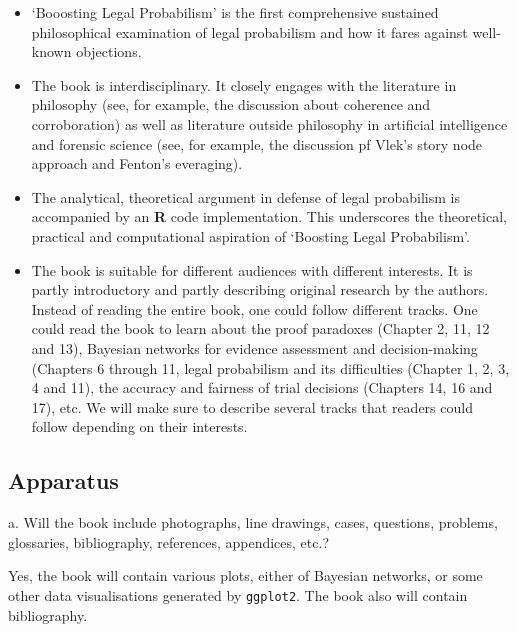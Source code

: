\documentclass[10pt,dvipsnames,enabledeprecatedfontcommands]{scrartcl}
\begin{document}
\begin{itemize}
\item
  `Booosting Legal Probabilism' is the first comprehensive sustained
  philosophical examination of legal probabilism and how it fares
  against well-known objections.
\item
  The book is interdisciplinary. It closely engages with the literature
  in philosophy (see, for example, the discussion about coherence and
  corroboration) as well as literature outside philosophy in artificial
  intelligence and forensic science (see, for example, the discussion pf
  Vlek's story node approach and Fenton's everaging).
\item
  The analytical, theoretical argument in defense of legal probabilism
  is accompanied by an \textbf{\textsf{R}} code implementation. This
  underscores the theoretical, practical and computational aspiration of
  `Boosting Legal Probabilism'.
\item
  The book is suitable for different audiences with different interests.
  It is partly introductory and partly describing original research by
  the authors. Instead of reading the entire book, one could follow
  different tracks. One could read the book to learn about the proof
  paradoxes (Chapter 2, 11, 12 and 13), Bayesian networks for evidence
  assessment and decision-making (Chapters 6 through 11, legal
  probabilism and its difficulties (Chapter 1, 2, 3, 4 and 11), the
  accuracy and fairness of trial decisions (Chapters 14, 16 and 17),
  etc. We will make sure to describe several tracks that readers could
  follow depending on their interests.
\end{itemize}


\subsection{Apparatus}\label{apparatus}

\footnotesize a. Will the book include photographs, line drawings,
cases, questions, problems, glossaries, bibliography, references,
appendices, etc.?

\vspace{2mm}

\normalsize 

Yes, the book will contain various plots, either of Bayesian networks,
or some other data visualisations generated by \texttt{ggplot2}. The
book also will contain bibliography. \vspace{2mm}
\end{document}
